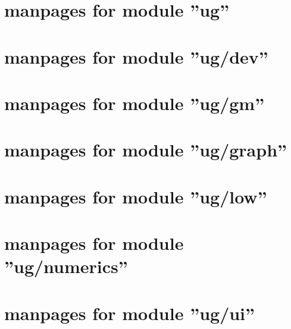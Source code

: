\newpage
{
\small
\tableofcontents
}
\clearpage

\thispagestyle{plain}
\section{manpages for module ''ug''}
\renewcommand{\sectitle}{ug}


\thispagestyle{plain}
\section{manpages for module ''ug/dev''}
\renewcommand{\sectitle}{ug/dev}


%

%

%

\thispagestyle{plain}
\section{manpages for module ''ug/gm''}
\renewcommand{\sectitle}{ug/gm}


\thispagestyle{plain}
\section{manpages for module ''ug/graph''}
\renewcommand{\sectitle}{ug/graph}


\thispagestyle{plain}
\section{manpages for module ''ug/low''}
\renewcommand{\sectitle}{ug/low}


\thispagestyle{plain}
\section{manpages for module ''ug/numerics''}
\renewcommand{\sectitle}{ug/numerics}


\thispagestyle{plain}
\section{manpages for module ''ug/ui''}
\renewcommand{\sectitle}{ug/ui}





